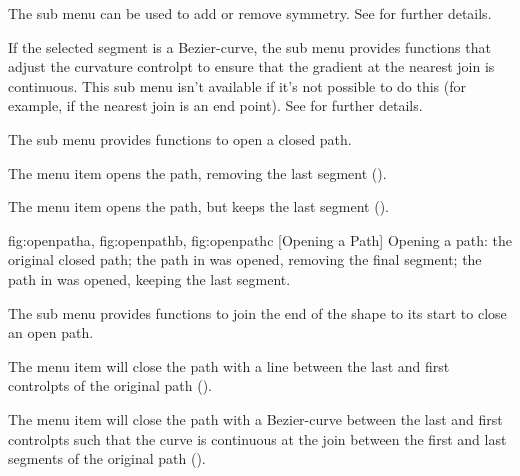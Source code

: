 
The  sub menu can be used to add or remove
\gls{symmetry}.
See  for further details.


If the selected segment is a \gls{Bezier-curve}, the
 sub menu provides functions that adjust
the curvature \gls*{controlpt} to ensure that the gradient at the
nearest join is continuous. This sub menu isn't available if it's not
possible to do this (for example, if the nearest join is an end
point). See  for further details.


The  sub menu provides functions to open a
closed path.


The  menu item
opens the path, removing the last segment ().


The  menu item
opens the path, but keeps the last segment ().

{
 {fig:openpatha}{}{},
 {fig:openpathb}{}{},
 {fig:openpathc}{}{}
}
  [Opening a Path]
  {Opening a path:  the original closed path;
    the path in  was opened,
   removing the final segment;  the path in 
    was opened, keeping the last segment.}


The  sub menu provides functions to join
the end of the \gls{shape} to its start to close an open path.


The  menu item will
close the path with a line between the last and first
\glspl*{controlpt} of the original path ().


The  menu item will
close the path with a \gls{Bezier-curve} between the last and first
\glspl*{controlpt} such that the curve is continuous at the join
between the first and last segments of the original path
().

